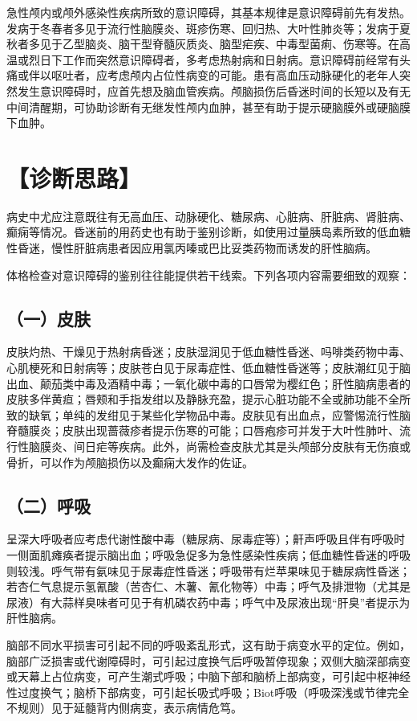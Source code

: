 急性颅内或颅外感染性疾病所致的意识障碍，其基本规律是意识障碍前先有发热。发病于冬春者多见于流行性脑膜炎、斑疹伤寒、回归热、大叶性肺炎等；发病于夏秋者多见于乙型脑炎、脑干型脊髓灰质炎、脑型疟疾、中毒型菌痢、伤寒等。在高温或烈日下工作而突然意识障碍者，多考虑热射病和日射病。意识障碍前经常有头痛或伴以呕吐者，应考虑颅内占位性病变的可能。患有高血压动脉硬化的老年人突然发生意识障碍时，应首先想及脑血管疾病。颅脑损伤后昏迷时间的长短以及有无中间清醒期，可协助诊断有无继发性颅内血肿，甚至有助于提示硬脑膜外或硬脑膜下血肿。

\section{【诊断思路】}

病史中尤应注意既往有无高血压、动脉硬化、糖尿病、心脏病、肝脏病、肾脏病、癫痫等情况。昏迷前的用药史也有助于鉴别诊断，如使用过量胰岛素所致的低血糖性昏迷，慢性肝脏病患者因应用氯丙嗪或巴比妥类药物而诱发的肝性脑病。

体格检查对意识障碍的鉴别往往能提供若干线索。下列各项内容需要细致的观察：

\subsection{（一）皮肤}

皮肤灼热、干燥见于热射病昏迷；皮肤湿润见于低血糖性昏迷、吗啡类药物中毒、心肌梗死和日射病等；皮肤苍白见于尿毒症性、低血糖性昏迷等；皮肤潮红见于脑出血、颠茄类中毒及酒精中毒；一氧化碳中毒的口唇常为樱红色；肝性脑病患者的皮肤多伴黄疸；唇颊和手指发绀以及静脉充盈，提示心脏功能不全或肺功能不全所致的缺氧；单纯的发绀见于某些化学物品中毒。皮肤见有出血点，应警惕流行性脑脊髓膜炎；皮肤出现蔷薇疹者提示伤寒的可能；口唇疱疹可并发于大叶性肺叶、流行性脑膜炎、间日疟等疾病。此外，尚需检查皮肤尤其是头颅部分皮肤有无伤痕或骨折，可以作为颅脑损伤以及癫痫大发作的佐证。

\subsection{（二）呼吸}

呈深大呼吸者应考虑代谢性酸中毒（糖尿病、尿毒症等）；鼾声呼吸且伴有呼吸时一侧面肌瘫痪者提示脑出血；呼吸急促多为急性感染性疾病；低血糖性昏迷的呼吸则较浅。呼气带有氨味见于尿毒症性昏迷；呼吸带有烂苹果味见于糖尿病性昏迷；若杏仁气息提示氢氰酸（苦杏仁、木薯、氰化物等）中毒；呼气及排泄物（尤其是尿液）有大蒜样臭味者可见于有机磷农药中毒；呼气中及尿液出现“肝臭”者提示为肝性脑病。

脑部不同水平损害可引起不同的呼吸紊乱形式，这有助于病变水平的定位。例如，脑部广泛损害或代谢障碍时，可引起过度换气后呼吸暂停现象；双侧大脑深部病变或天幕上占位病变，可产生潮式呼吸；中脑下部和脑桥上部病变，可引起中枢神经性过度换气；脑桥下部病变，可引起长吸式呼吸；Biot呼吸（呼吸深浅或节律完全不规则）见于延髓背内侧病变，表示病情危笃。

